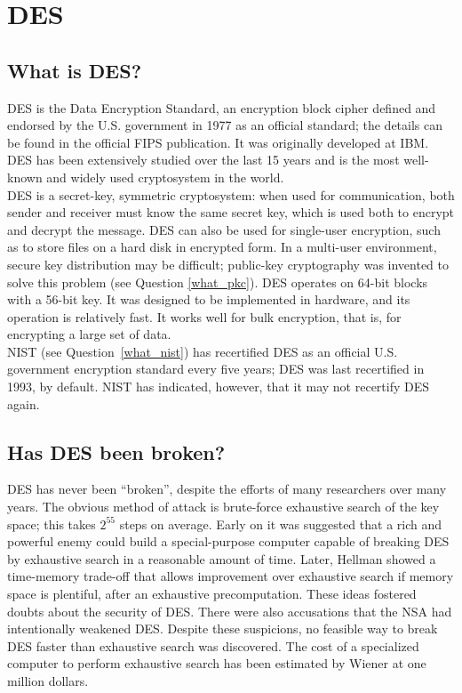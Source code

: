 \section{DES}

\subsection{What is DES?}
\label{what_des}

DES is the Data Encryption Standard, an encryption block cipher defined
and endorsed by the U.S. government in 1977 as an official standard;
the details can be found in the official FIPS publication. It was
originally developed at IBM. DES has been extensively studied over the
last 15 years and is the most well-known and widely used cryptosystem
in the world.\\

DES is a secret-key, symmetric cryptosystem: when used for communication,
both sender and receiver must know the same secret key, which is used both
to encrypt and decrypt the message. DES can also be used for single-user
encryption, such as to store files on a hard disk in encrypted form. In a
multi-user environment, secure key distribution may be difficult;
public-key cryptography was invented to solve this problem (see Question
\ref{what_pkc}). DES operates on 64-bit blocks with a 56-bit key. It was
designed to be implemented in hardware, and its operation is relatively
fast. It works well for bulk encryption, that is, for encrypting a large
set of data.\\

NIST (see Question~\ref{what_nist}) has recertified DES as an official U.S.
government encryption standard every five years; DES was last recertified
in 1993, by default. NIST has indicated, however, that it may not recertify
DES again.

\subsection{Has DES been broken?}

DES has never been ``broken'', despite the efforts of many researchers
over many years. The obvious method of attack is brute-force exhaustive
search of the key space; this takes $2^{55}$ steps on average. Early on
it was suggested that a rich and powerful enemy could build a
special-purpose computer capable of breaking DES by exhaustive search
in a reasonable amount of time. Later, Hellman showed a time-memory
trade-off that allows improvement over exhaustive search if memory
space is plentiful, after an exhaustive precomputation. These ideas
fostered doubts about the security of DES. There were also accusations
that the NSA had intentionally weakened DES. Despite these suspicions,
no feasible way to break DES faster than exhaustive search was
discovered. The cost of a specialized computer to perform exhaustive
search has been estimated by Wiener at one million dollars.\\

